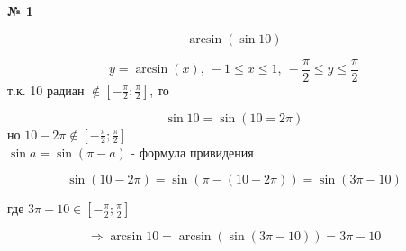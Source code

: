 \documentclass{article}
\begin{document}
\textbf{№ 1} 

\begingroup
\Large

$$\arcsin(\sin10) $$

$$ y = \arcsin(x),\ -1\leq x \leq1, \  -\frac{\pi}{2} \leq y \leq \frac{\pi}{2} $$
т.к. 10 радиан $\notin [-\frac{\pi}{2};\frac{\pi}{2}]$, то

$$ \sin{10} = \sin(10=2\pi)$$
но $10-2\pi \notin [-\frac{\pi}{2};\frac{\pi}{2}]$ \\
$\sin{a} = \sin(\pi - a)$ - формула привидения

$$ \sin(10 - 2\pi) 
= \sin(\pi - (10 - 2\pi))
= \sin(3\pi - 10)$$

где $ 3\pi - 10 \in [-\frac{\pi}{2};\frac{\pi}{2}]$

$$ \Rightarrow \arcsin{10} 
= \arcsin(\sin(3\pi - 10))
= 3\pi - 10$$


\endgroup
\end{document}
